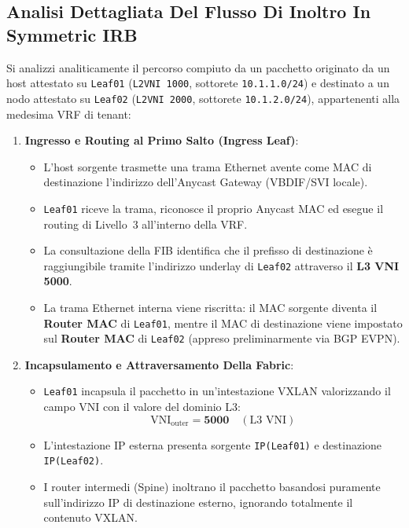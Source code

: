 \documentclass[11pt, a4paper]{article}
\begin{document}
\subsection{Analisi Dettagliata Del Flusso Di Inoltro In Symmetric IRB}

Si analizzi analiticamente il percorso compiuto da un pacchetto originato da un host attestato su \texttt{Leaf01} (\texttt{L2VNI 1000}, sottorete \texttt{10.1.1.0/24}) e destinato a un nodo attestato su \texttt{Leaf02} (\texttt{L2VNI 2000}, sottorete \texttt{10.1.2.0/24}), appartenenti alla medesima VRF di tenant:

\begin{enumerate}
    \item \textbf{Ingresso e Routing al Primo Salto (Ingress Leaf)}:
    \begin{itemize}[noitemsep]
        \item L'host sorgente trasmette una trama Ethernet avente come MAC di destinazione l'indirizzo dell'Anycast Gateway (VBDIF/SVI locale).
        \item \texttt{Leaf01} riceve la trama, riconosce il proprio Anycast MAC ed esegue il routing di Livello~3 all'interno della VRF.
        \item La consultazione della FIB identifica che il prefisso di destinazione è raggiungibile tramite l'indirizzo underlay di \texttt{Leaf02} attraverso il \textbf{L3 VNI 5000}.
        \item La trama Ethernet interna viene riscritta: il MAC sorgente diventa il \textbf{Router MAC} di \texttt{Leaf01}, mentre il MAC di destinazione viene impostato sul \textbf{Router MAC} di \texttt{Leaf02} (appreso preliminarmente via BGP EVPN).
    \end{itemize}
    \item \textbf{Incapsulamento e Attraversamento Della Fabric}:
    \begin{itemize}[noitemsep]
        \item \texttt{Leaf01} incapsula il pacchetto in un'intestazione VXLAN valorizzando il campo VNI con il valore del dominio L3:
        \[
        \text{VNI}_{\text{outer}} = \mathbf{5000} \quad (\text{L3 VNI})
        \]
        \item L'intestazione IP esterna presenta sorgente \texttt{IP(Leaf01)} e destinazione \texttt{IP(Leaf02)}.
        \item I router intermedi (Spine) inoltrano il pacchetto basandosi puramente sull'indirizzo IP di destinazione esterno, ignorando totalmente il contenuto VXLAN.

\end{itemize}
\end{enumerate}
\end{document}
